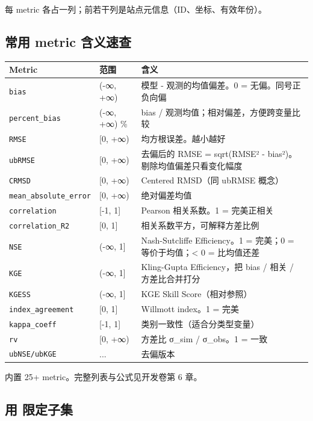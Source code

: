 每 metric 各占一列；前若干列是站点元信息（ID、坐标、有效年份）。

\subsection{常用 metric 含义速查}

\begin{longtable}{l p{3cm} p{8cm}}
  \toprule
  Metric & 范围 & 含义 \\
  \midrule
  \endhead
  \texttt{bias} & (-∞, +∞) & 模型 - 观测的均值偏差。0 = 无偏。同号正负向偏 \\
  \texttt{percent\_bias} & (-∞, +∞) \% & bias / 观测均值；相对偏差，方便跨变量比较 \\
  \texttt{RMSE} & [0, +∞) & 均方根误差。越小越好 \\
  \texttt{ubRMSE} & [0, +∞) & 去偏后的 RMSE = sqrt(RMSE² - bias²)。剔除均值偏差只看变化幅度 \\
  \texttt{CRMSD} & [0, +∞) & Centered RMSD（同 ubRMSE 概念） \\
  \texttt{mean\_absolute\_error} & [0, +∞) & 绝对偏差均值 \\
  \texttt{correlation} & [-1, 1] & Pearson 相关系数。1 = 完美正相关 \\
  \texttt{correlation\_R2} & [0, 1] & 相关系数平方，可解释方差比例 \\
  \texttt{NSE} & (-∞, 1] & Nash-Sutcliffe Efficiency。1 = 完美；0 = 等价于均值；< 0 = 比均值还差 \\
  \texttt{KGE} & (-∞, 1] & Kling-Gupta Efficiency，把 bias / 相关 / 方差比合并打分 \\
  \texttt{KGESS} & (-∞, 1] & KGE Skill Score（相对参照） \\
  \texttt{index\_agreement} & [0, 1] & Willmott index。1 = 完美 \\
  \texttt{kappa\_coeff} & [-1, 1] & 类别一致性（适合分类型变量） \\
  \texttt{rv} & [0, +∞) & 方差比 σ\_sim / σ\_obs。1 = 一致 \\
  \texttt{ubNSE/ubKGE} & ... & 去偏版本 \\
  \bottomrule
\end{longtable}

\openbench{} 内置 25+ metric。完整列表与公式见开发卷第 6 章。

\subsection{用  限定子集}

